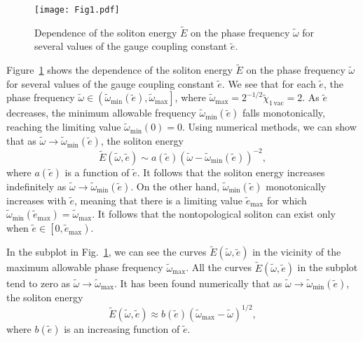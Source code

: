\begin{figure}[tbp]
\texttt{[image: Fig1.pdf]}
\caption{\label{fig1}   Dependence  of  the  soliton  energy $\tilde{E}$ on the
phase frequency $\tilde{\omega}$  for  several  values  of  the  gauge coupling
constant $\tilde{e}$.}
\end{figure}

Figure~\ref{fig1} shows the dependence of the soliton energy $\tilde{E}$ on the
phase frequency  $\tilde{\omega}$  for  several  values  of  the gauge coupling
constant $\tilde{e}$.
We see that for each $\tilde{e}$, the phase frequency $\tilde{\omega}\in \left(
\tilde{\omega}_{\min}(\tilde{e}), \tilde{\omega}_{\max}\right]$, where $\tilde{
\omega}_{\max} = 2^{-1/2}\tilde{\chi}_{1\, \text{vac}} = 2$.
As $\tilde{e}$ decreases, the minimum allowable frequency $\tilde{\omega}_{\min
}(\tilde{e})$ falls  monotonically,  reaching the limiting value $\tilde{\omega
}_{\min}(0) = 0$.
Using numerical  methods,  we  can  show  that  as  $\tilde{\omega} \rightarrow
\tilde{\omega}_{\min}(\tilde{e})$, the soliton energy
\begin{equation}
\tilde{E}\left(\tilde{\omega},\tilde{e}\right) \sim a(\tilde{e})
(\tilde{\omega}-\tilde{\omega}_{\min}(\tilde{e}))^{-2},             \label{V:3}
\end{equation}
where $a(\tilde{e})$ is a function of $\tilde{e}$.
It follows that the  soliton  energy  increases indefinitely as $\tilde{\omega}
\rightarrow \tilde{\omega}_{\min}(\tilde{e})$.
On the  other  hand, $\tilde{\omega}_{\min}(\tilde{e})$ monotonically increases
with $\tilde{e}$, meaning that  there  is  a  limiting value $\tilde{e}_{\max}$
for which  $\tilde{\omega}_{\min}(\tilde{e}_{\max})  =  \tilde{\omega}_{\max}$.
It follows that the nontopological  soliton  can exist only when $\tilde{e} \in
\left[0, \tilde{e}_{\max}\right)$.


In the subplot in Fig.~\ref{fig1},  we  can  see  the curves $\tilde{E}(\tilde{
\omega},\tilde{e})$ in the vicinity of the maximum   allowable  phase frequency
$\tilde{\omega}_{\max}$. %
All  the   curves   $\tilde{E}(\tilde{\omega},  \tilde{e})$ in the subplot tend
to zero as $\tilde{\omega} \rightarrow \tilde{\omega}_{\max}$.
It has been found numerically that as $\tilde{\omega} \rightarrow \tilde{\omega
}_{\min}(\tilde{e})$, the soliton energy
\begin{equation}
\tilde{E}\left(\tilde{\omega},\tilde{e}\right)\approx b(\tilde{e}
)\left(\tilde{\omega}_{\max}-\tilde{\omega}\right)^{1/2},           \label{V:4}
\end{equation}
where $b(\tilde{e})$ is an increasing function of $\tilde{e}$.


